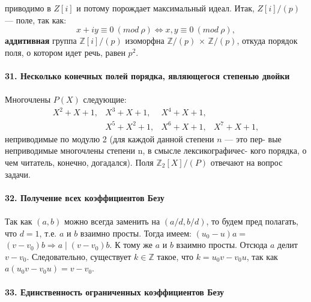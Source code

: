 \documentclass{mai_book}
\begin{document}
приводимо в $Z[i]$ и потому порождает максимальный идеал. Итак,\linebreak
$Z[i]/(p)$ ---  поле, так как:
$$x + iy \equiv 0 ~(mod~ \rho) \Longleftrightarrow x, y \equiv 0 ~(mod~ \rho ),$$
\textbf{аддитивная} группа $\mathbb{Z}[i]/(p)$  изоморфна $\mathbb{Z}/(p)$ $\times$ $\mathbb{Z}/(p)$, откуда порядок\linebreak
поля, о котором идет речь, равен $p^{2}$.\\
\\
\noindent\textbf{31. Несколько конечных полей порядка, являющегося\linebreak
степенью двойки}\\
\\
Многочлены $P(X)$ следующие:
			$$\begin{array}{llll}
							 X^2 + X + 1,   & X^3 + X + 1,   & X^4 + X + 1,\\ 
			                          & X^5 + X^2 + 1, & X^6 + X + 1, & X^7 + X + 1, 
			\end{array}$$
\newpage
\noindent неприводимые по модулю 2 (для каждой данной степени $n$ --- это пер-\linebreak 
вые неприводимые многочлены степени n, в смысле лексикографичес-­\linebreak
кого порядка, о чем читатель, конечно, догадался). Поля $\mathbb{Z}_2[X]/(P)$\linebreak
отвечают на вопрос задачи.\\
\\
\noindent\textbf{32. Получение всех коэффициентов Безу}\\
\\
\hspace*{15pt}Так как $(a, b)$ можно всегда заменить на $(a/d, b/d)$, то будем пред­\linebreak
полагать, что $d = 1$, т.е. $a$ и $b$ взаимно просты. Тогда имеем: $(u_0 - u)a =$ \linebreak
$(v - v_0)b \Rightarrow a \mid (v - v_0)b$. К тому же $a$ и $b$  взаимно просты. Отсюда $a$\linebreak
делит $v - v_0$. Следовательно, существует $k \in \mathbb{Z}$ такое, что $k = u_0v - v_0u$,\linebreak
так как $a(u_0v - v_0u) = v - v_0$.\\
\\
\noindent\textbf{33. Единственность ограниченных коэффициентов Безу}\\
\end{document}
